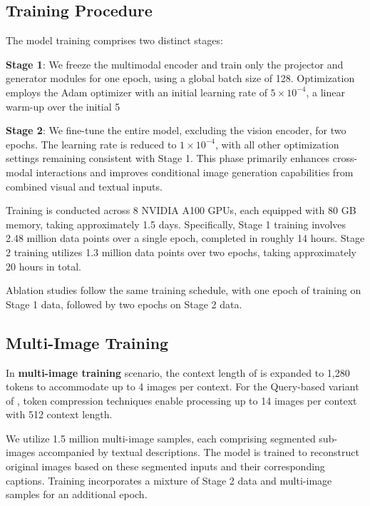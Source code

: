 \subsection{Training Procedure}
\label{sec:tra_Details}

The model training comprises two distinct stages:

\textbf{Stage 1}: We freeze the multimodal encoder and train only the projector and generator modules for one epoch, using a global batch size of 128. Optimization employs the Adam optimizer with an initial learning rate of $5 \times 10^{-4}$, a linear warm-up over the initial 5%

\textbf{Stage 2}: We fine-tune the entire model, excluding the vision encoder, for two epochs. The learning rate is reduced to $1 \times 10^{-4}$, with all other optimization settings remaining consistent with Stage 1. This phase primarily enhances cross-modal interactions and improves conditional image generation capabilities from combined visual and textual inputs.

Training is conducted across 8 NVIDIA A100 GPUs, each equipped with 80 GB memory, taking approximately 1.5 days. Specifically, Stage 1 training involves 2.48 million data points over a single epoch, completed in roughly 14 hours. Stage 2 training utilizes 1.3 million data points over two epochs, taking approximately 20 hours in total.

Ablation studies follow the same training schedule, with one epoch of training on Stage 1 data, followed by two epochs on Stage 2 data.

\subsection{Multi-Image Training}
\label{sub:multi_init_Details}
In \textbf{multi-image training} scenario, the context length of \model is expanded to 1,280 tokens to accommodate up to 4 images per context. For the Query-based variant of \model, token compression techniques enable processing up to 14 images per context with 512 context length.

We utilize 1.5 million multi-image samples, each comprising segmented sub-images accompanied by textual descriptions. The model is trained to reconstruct original images based on these segmented inputs and their corresponding captions. Training incorporates a mixture of Stage 2 data and multi-image samples for an additional epoch.

